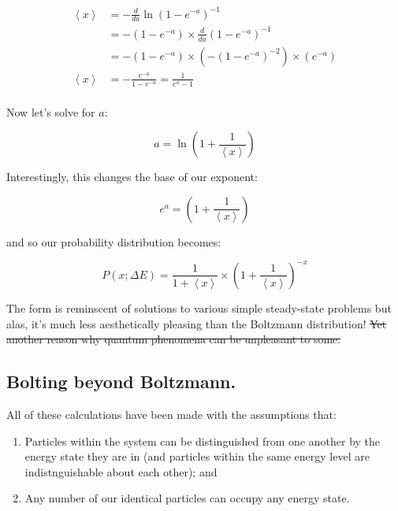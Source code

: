 \documentclass[letterpaper,12pt]{report}
\providecommand{\tightlist}{%
  \setlength{\itemsep}{0pt}\setlength{\parskip}{0pt}}
\begin{document}
\[\begin{split}
  \left<x\right> &= -\frac{d}{da}\ln{\left(1 - e^{-a}\right)^{-1}} \\
             &= -\left(1 - e^{-a}\right) \times \frac{d}{da}\left(1 - e^{-a}\right)^{-1} \\
             &= -\left(1 - e^{-a}\right) \times \left(-\left(1 - e^{-a}\right)^{-2}\right) 
              \times \left(e^{-a}\right) \\ 
  \left<x\right> &= -\frac{e^{-a}}{1 - e^{-a}} = \frac{1}{e^a - 1} \\
\end{split}
\]


Now let's solve for \(a\):

\[a = \ln{\left(1 + \frac{1}{\left<x\right>}\right)} \]

Interestingly, this changes the base of our exponent:

\[e^{a} = \left(1 + \frac{1}{\left<x\right>}\right) \]

and so our probability distribution becomes:

\[P(x;\Delta E) = \frac{1}{1 + \left<x\right>} 
      \times {\left(1 + \frac{1}{\left<x\right>}\right)}^{-x}
\]

The form is reminscent of solutions to various simple steady-state problems \textemdash{} 
but alas, it's much less aesthetically pleasing than the Boltzmann distribution!
\sout{Yet another reason why quantum phenomena can be unpleasant to some.}

\subsection{Bolting beyond Boltzmann.}

All of these calculations have been made with the assumptions that:
\begin{enumerate}
  \tightlist
  \item
    Particles within the system can be distinguished from one another by the 
    energy state they are in (and particles within the same energy level are
    indistnguishable about each other); and
  \item
    Any number of our identical particles can occupy any energy state.
\end{enumerate}
\end{document}
